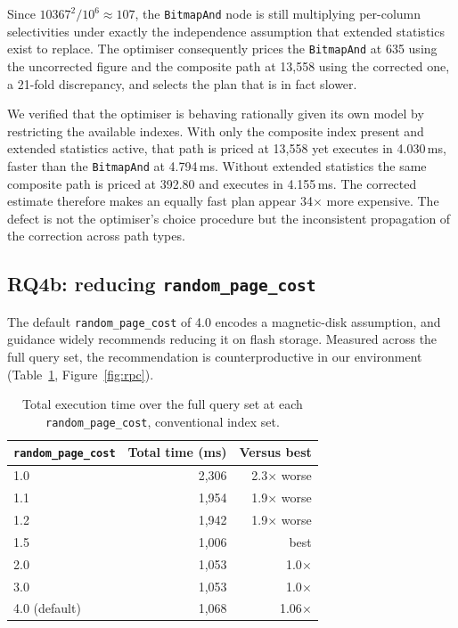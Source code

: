 \documentclass[preprint,12pt,authoryear]{elsarticle}
\newcommand{\rpc}{\texttt{random\_page\_cost}}
\begin{document}
Since $10367^2 / 10^6 \approx 107$, the \texttt{BitmapAnd} node is
still multiplying per-column selectivities under exactly the
independence assumption that extended statistics exist to replace. The
optimiser consequently prices the \texttt{BitmapAnd} at 635 using the
uncorrected figure and the composite path at 13{,}558 using the
corrected one, a 21-fold discrepancy, and selects the plan that is in
fact slower.

We verified that the optimiser is behaving rationally given its own
model by restricting the available indexes. With only the composite
index present and extended statistics active, that path is priced at
13{,}558 yet executes in 4.030\,ms, faster than the
\texttt{BitmapAnd} at 4.794\,ms. Without extended statistics the same
composite path is priced at 392.80 and executes in 4.155\,ms. The
corrected estimate therefore makes an equally fast plan appear
34$\times$ more expensive. The defect is not the optimiser's choice
procedure but the inconsistent propagation of the correction across
path types.

\subsection{RQ4b: reducing \rpc{}}
\label{sec:rpc}

The default \rpc{} of 4.0 encodes a magnetic-disk assumption, and
guidance widely recommends reducing it on flash storage. Measured
across the full query set, the recommendation is counterproductive in
our environment (Table~\ref{tab:rpc}, Figure~\ref{fig:rpc}).

\begin{table}[htbp]
\centering
\caption{Total execution time over the full query set at each \rpc{},
conventional index set.}
\label{tab:rpc}
\small
\begin{tabular}{@{}lrr@{}}
\toprule
\rpc{} & Total time (ms) & Versus best \\
\midrule
1.0 & 2{,}306 & 2.3$\times$ worse \\
1.1 & 1{,}954 & 1.9$\times$ worse \\
1.2 & 1{,}942 & 1.9$\times$ worse \\
1.5 & 1{,}006 & best \\
2.0 & 1{,}053 & 1.0$\times$ \\
3.0 & 1{,}053 & 1.0$\times$ \\
4.0 (default) & 1{,}068 & 1.06$\times$ \\
\bottomrule
\end{tabular}
\end{table}
\end{document}
